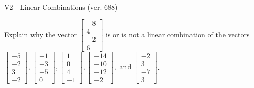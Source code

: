 \begin{exercise}
  \begin{exerciseTitle}V2 - Linear Combinations (ver. 688)\end{exerciseTitle}
  \begin{exerciseStatement}
    Explain why the vector \(\left[\begin{array}{c}
-8 \\
4 \\
-2 \\
6
\end{array}\right]\)  is or is not a linear 
	combination of the vectors \(\left[\begin{array}{c}
-5 \\
-2 \\
3 \\
-2
\end{array}\right] , \left[\begin{array}{c}
-1 \\
-3 \\
-5 \\
0
\end{array}\right] , \left[\begin{array}{c}
1 \\
0 \\
4 \\
-1
\end{array}\right] , \left[\begin{array}{c}
-14 \\
-10 \\
-12 \\
-2
\end{array}\right] , \text{ and } \left[\begin{array}{c}
-2 \\
3 \\
-7 \\
3
\end{array}\right]\).
	



\end{exerciseStatement}
\end{exercise}
